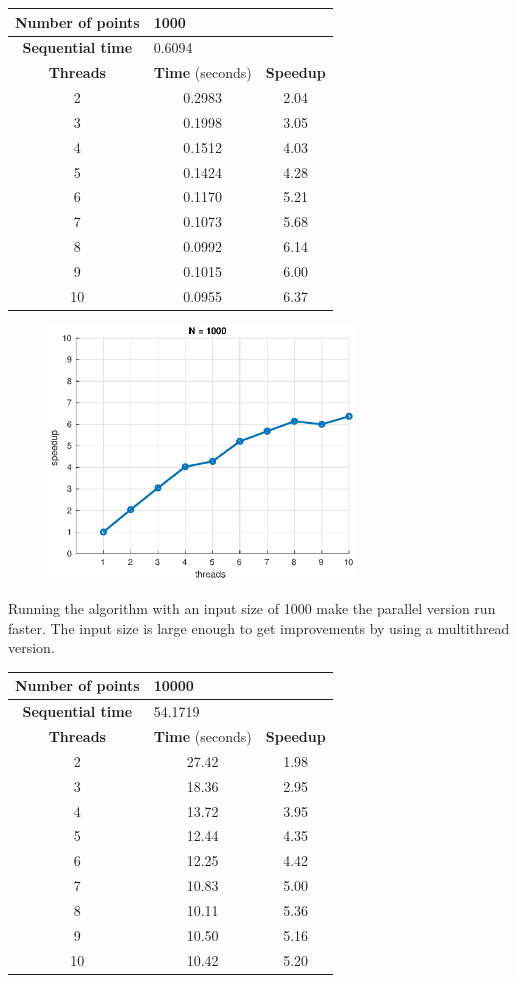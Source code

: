 \documentclass[10pt,twocolumn,letterpaper]{article}
\begin{document}
\begin{table}[H]
\begin{tabular}{c c c}
\hline
\textbf{Number of points} & \multicolumn{2}{l}{1000} \\ 
\hline
\textbf{Sequential time} & \multicolumn{2}{l}{0.6094} \\
\hline
\textbf{Threads} & \textbf{Time} (seconds) & \textbf{Speedup} \\
\hline
2 & 0.2983 & 2.04 \\
3 & 0.1998 & 3.05 \\
4 & 0.1512 & 4.03 \\
5 & 0.1424 & 4.28 \\
6 & 0.1170 & 5.21 \\
7 & 0.1073 & 5.68 \\
8 & 0.0992 & 6.14 \\
9 & 0.1015 & 6.00 \\
10 & 0.0955 & 6.37 \\
\end{tabular}
\end{table}

\begin{figure}[H]
\centering
\includegraphics[width=3.2in]{fig/speedup1000.eps}
\end{figure}

Running the algorithm with an input size of 1000 make the parallel version run faster. The input size is large enough to get improvements by using a multithread version.

\begin{table}[H]
\centering
\begin{tabular}{ccc}
\hline
\textbf{Number of points} & \multicolumn{2}{l}{10000} \\ 
\hline
\textbf{Sequential time} & \multicolumn{2}{l}{54.1719} \\
\hline
\textbf{Threads} & \textbf{Time} (seconds) & \textbf{Speedup} \\
\hline
2 & 27.42 & 1.98 \\
3 & 18.36 & 2.95 \\
4 & 13.72 & 3.95 \\
5 & 12.44 & 4.35 \\
6 & 12.25 & 4.42 \\
7 & 10.83 & 5.00 \\
8 & 10.11 & 5.36 \\
9 & 10.50 & 5.16 \\
10 & 10.42 & 5.20 \\
\hline
\end{tabular}
\end{table}
\end{document}
